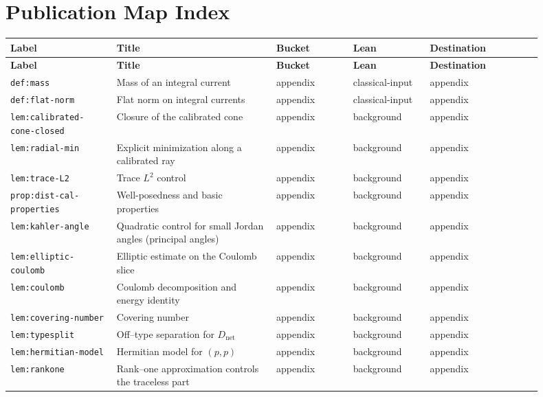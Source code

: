 \documentclass[11pt]{article}
\numberwithin{equation}{section}  %
\theoremstyle{plain}
\theoremstyle{definition}
\theoremstyle{remark}
\begin{document}
\section*{Publication Map Index}
\begingroup
\footnotesize
\setlength{\LTpre}{0pt}
\setlength{\LTpost}{0pt}
\begin{longtable}{|p{0.18\linewidth}|p{0.27\linewidth}|p{0.13\linewidth}|p{0.13\linewidth}|p{0.19\linewidth}|}
\hline
\textbf{Label} & \textbf{Title} & \textbf{Bucket} & \textbf{Lean} & \textbf{Destination} \\ \hline
\endfirsthead
\hline
\textbf{Label} & \textbf{Title} & \textbf{Bucket} & \textbf{Lean} & \textbf{Destination} \\ \hline
\endhead
\texttt{def:mass} & Mass of an integral current & appendix & classical-input & appendix \\ \hline
\texttt{def:flat-norm} & Flat norm on integral currents & appendix & classical-input & appendix \\ \hline
\texttt{lem:calibrated-cone-closed} & Closure of the calibrated cone & appendix & background & appendix \\ \hline
\texttt{lem:radial-min} & Explicit minimization along a calibrated ray & appendix & background & appendix \\ \hline
\texttt{lem:trace-L2} & Trace $L^{2}$ control & appendix & background & appendix \\ \hline
\texttt{prop:dist-cal-properties} & Well-posedness and basic properties & appendix & background & appendix \\ \hline
\texttt{lem:kahler-angle} & Quadratic control for small Jordan angles (principal angles) & appendix & background & appendix \\ \hline
\texttt{lem:elliptic-coulomb} & Elliptic estimate on the Coulomb slice & appendix & background & appendix \\ \hline
\texttt{lem:coulomb} & Coulomb decomposition and energy identity & appendix & background & appendix \\ \hline
\texttt{lem:covering-number} & Covering number & appendix & background & appendix \\ \hline
\texttt{lem:typesplit} & Off--type separation for $D_{\mathrm{net}}$ & appendix & background & appendix \\ \hline
\texttt{lem:hermitian-model} & Hermitian model for $(p,p)$ & appendix & background & appendix \\ \hline
\texttt{lem:rankone} & Rank--one approximation controls the traceless part & appendix & background & appendix \\ \hline

\end{longtable}
\end{document}
